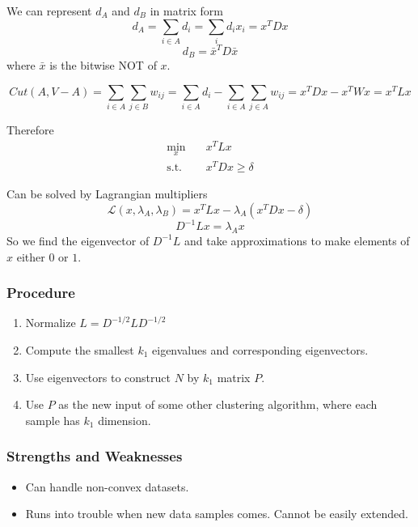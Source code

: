         We can represent $d_A$ and $d_B$ in matrix form
        \[ d_A = \sum_{i\in A}d_i = \sum_i d_ix_i = x^TDx \]
        \[ d_B = \bar{x}^TD\bar{x} \]
        where $\bar{x}$ is the bitwise NOT of $x$.

        \[ Cut(A, V-A) = \sum_{i\in A}\sum_{j\in B}w_{ij} = \sum_{i \in A}d_i - \sum_{i \in A}\sum_{j \in A}w_{ij} = x^TDx - x^TWx = x^TLx \]

        Therefore
        \begin{align*}
            \min_x &\quad x^TLx\\
            \text{s.t.} &\quad x^TDx \ge \delta
        \end{align*}

        Can be solved by Lagrangian multipliers
        \[ \mathcal{L}(x, \lambda_A, \lambda_B) = x^TLx - \lambda_A(x^TDx-\delta) \]
        \[ D^{-1}Lx = \lambda_A x \]
        So we find the eigenvector of $D^{-1}L$ and take approximations to make elements of $x$ either $0$ or $1$.

        \subsubsection{Procedure}
            \begin{enumerate}
                \item Normalize $L = D^{-1/2}LD^{-1/2}$
                \item Compute the smallest $k_1$ eigenvalues and corresponding eigenvectors.
                \item Use eigenvectors to construct $N$ by $k_1$ matrix $P$.
                \item Use $P$ as the new input of some other clustering algorithm, where each sample has $k_1$ dimension.
            \end{enumerate}

        \subsubsection{Strengths and Weaknesses}
        \begin{itemize}
            \item Can handle non-convex datasets.
            \item Runs into trouble when new data samples comes. Cannot be easily extended.
        \end{itemize}
